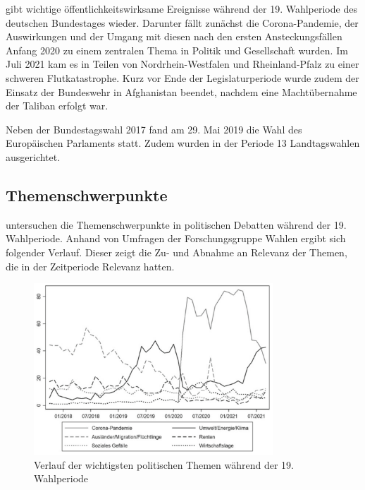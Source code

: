 \textcite{schmid_deutscher_2021} gibt wichtige öffentlichkeitswirksame Ereignisse während der \num{19}. Wahlperiode des deutschen Bundestages wieder. Darunter fällt zunächst die Corona-Pandemie, der Auswirkungen und der Umgang mit diesen nach den ersten Ansteckungsfällen Anfang 2020 zu einem zentralen Thema in Politik und Gesellschaft wurden. Im Juli 2021 kam es in Teilen von Nordrhein-Westfalen und Rheinland-Pfalz zu einer schweren Flutkatastrophe. Kurz vor Ende der Legislaturperiode wurde zudem der Einsatz der Bundeswehr in Afghanistan beendet, nachdem eine Machtübernahme der Taliban erfolgt war.

Neben der Bundestagswahl \num{2017} fand am 29. Mai 2019 die Wahl des Europäischen Parlaments statt. Zudem wurden in der Periode \num{13} Landtagswahlen ausgerichtet.

\subsection{Themenschwerpunkte} \label{subsec:themenschwerpunkte}

\textcite{engler_wettbewerb_2022} untersuchen die Themenschwerpunkte in politischen Debatten während der \num{19}. Wahlperiode. Anhand von Umfragen der Forschungsgruppe Wahlen ergibt sich folgender Verlauf. Dieser zeigt die Zu- und Abnahme an Relevanz der Themen, die in der Zeitperiode Relevanz hatten.

\begin{figure}[H]
  \centering
  \includegraphics[width=0.8\textwidth]{data/images/themenkonjunktur.png}
  \caption{Verlauf der wichtigsten politischen Themen während der 19. Wahlperiode \autocite{engler_wettbewerb_2022, forschungsgruppe_wahlen_forschungsgruppe_nodate}} \label{fig:themenkonjunktur}
\end{figure}

